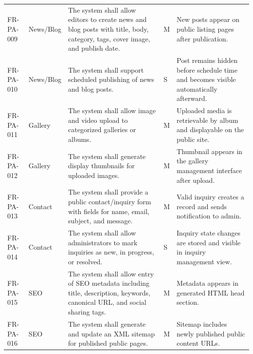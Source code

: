 \documentclass[12pt,a4paper]{article}
\begin{document}
\begin{longtable}{@{}L{2cm}L{2.4cm}L{6cm}C{0.9cm}L{3.4cm}@{}}
FR-PA-009 & News/Blog & The system shall allow editors to create news and blog posts with title, body, category, tags, cover image, and publish date. & M & New posts appear on public listing pages after publication. \\
FR-PA-010 & News/Blog & The system shall support scheduled publishing of news and blog posts. & S & Post remains hidden before schedule time and becomes visible automatically afterward. \\
FR-PA-011 & Gallery & The system shall allow image and video upload to categorized galleries or albums. & M & Uploaded media is retrievable by album and displayable on the public site. \\
FR-PA-012 & Gallery & The system shall generate display thumbnails for uploaded images. & M & Thumbnail appears in the gallery management interface after upload. \\
FR-PA-013 & Contact & The system shall provide a public contact/inquiry form with fields for name, email, subject, and message. & M & Valid inquiry creates a record and sends notification to admin. \\
FR-PA-014 & Contact & The system shall allow administrators to mark inquiries as new, in progress, or resolved. & S & Inquiry state changes are stored and visible in inquiry management view. \\
FR-PA-015 & SEO & The system shall allow entry of SEO metadata including title, description, keywords, canonical URL, and social sharing tags. & M & Metadata appears in generated HTML head section. \\
FR-PA-016 & SEO & The system shall generate and update an XML sitemap for published public pages. & M & Sitemap includes newly published public content URLs. \\


\end{longtable}
\end{document}

